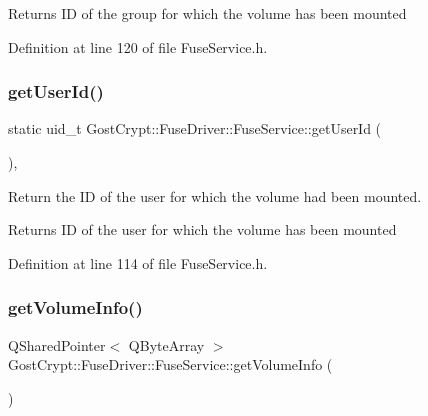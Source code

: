 \begin{DoxyReturn}{Returns}
ID of the group for which the volume has been mounted 
\end{DoxyReturn}


Definition at line 120 of file Fuse\+Service.\+h.

\mbox{\label{class_gost_crypt_1_1_fuse_driver_1_1_fuse_service_a77061e84ee50b0d85c18bfe27536480a}} 
\subsubsection{\texorpdfstring{get\+User\+Id()}{getUserId()}}
{\footnotesize\ttfamily static uid\+\_\+t Gost\+Crypt\+::\+Fuse\+Driver\+::\+Fuse\+Service\+::get\+User\+Id (\begin{DoxyParamCaption}{ }\end{DoxyParamCaption})\hspace{0.3cm}{\ttfamily [inline]}, {\ttfamily [static]}}



Return the ID of the user for which the volume had been mounted. 

\begin{DoxyReturn}{Returns}
ID of the user for which the volume has been mounted 
\end{DoxyReturn}


Definition at line 114 of file Fuse\+Service.\+h.

\mbox{\label{class_gost_crypt_1_1_fuse_driver_1_1_fuse_service_affb0e817b2cf32cca44e161eadb1f75f}} 
\subsubsection{\texorpdfstring{get\+Volume\+Info()}{getVolumeInfo()}}
{\footnotesize\ttfamily Q\+Shared\+Pointer$<$ Q\+Byte\+Array $>$ Gost\+Crypt\+::\+Fuse\+Driver\+::\+Fuse\+Service\+::get\+Volume\+Info (\begin{DoxyParamCaption}{ }\end{DoxyParamCaption})\hspace{0.3cm}{\ttfamily [static]}}



